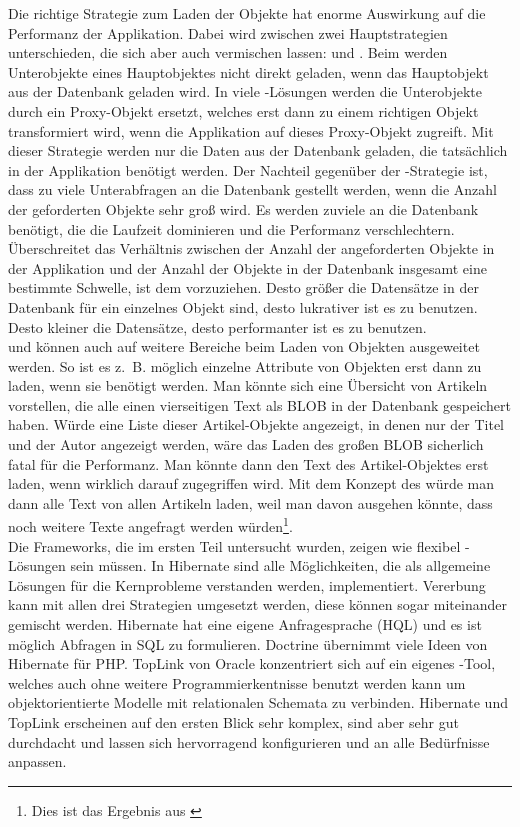 Die richtige Strategie zum Laden der Objekte hat enorme Auswirkung auf die Performanz der Applikation. Dabei wird zwischen zwei Hauptstrategien unterschieden, die sich aber auch vermischen lassen:  und . Beim  werden Unterobjekte eines Hauptobjektes nicht direkt geladen, wenn das Hauptobjekt aus der Datenbank geladen wird. In viele \ORM-Lösungen werden die Unterobjekte durch ein Proxy-Objekt ersetzt, welches erst dann zu einem richtigen Objekt transformiert wird, wenn die Applikation auf dieses Proxy-Objekt zugreift. Mit dieser Strategie werden nur die Daten aus der Datenbank geladen, die tatsächlich in der Applikation benötigt werden. Der Nachteil gegenüber der -Strategie ist, dass zu viele Unterabfragen an die Datenbank gestellt werden, wenn die Anzahl der geforderten Objekte sehr groß wird. Es werden zuviele  an die Datenbank benötigt, die die Laufzeit dominieren und die Performanz verschlechtern. Überschreitet das Verhältnis zwischen der Anzahl der angeforderten Objekte in der Applikation und der Anzahl der Objekte in der Datenbank insgesamt eine bestimmte Schwelle, ist  dem  vorzuziehen. Desto größer die Datensätze in der Datenbank für ein einzelnes Objekt sind, desto lukrativer ist es  zu benutzen. Desto kleiner die Datensätze, desto performanter ist es  zu benutzen. \\
 und  können auch auf weitere Bereiche beim Laden von Objekten ausgeweitet werden. So ist es z.~B. möglich einzelne Attribute von Objekten erst dann zu laden, wenn sie benötigt werden. Man könnte sich eine Übersicht von Artikeln vorstellen, die alle einen vierseitigen Text als BLOB in der Datenbank gespeichert haben. Würde eine Liste dieser Artikel-Objekte angezeigt, in denen nur der Titel und der Autor angezeigt werden, wäre das Laden des großen BLOB sicherlich fatal für die Performanz. Man könnte dann den Text des Artikel-Objektes erst laden, wenn wirklich darauf zugegriffen wird. Mit dem Konzept des  würde man dann alle Text von allen Artikeln laden, weil man davon ausgehen könnte, dass noch weitere Texte angefragt werden würden\footnote{Dies ist das Ergebnis aus \cite{Bernstein99context-basedprefetch}}. \\
Die Frameworks, die im ersten Teil untersucht wurden, zeigen wie flexibel \ORM-Lösungen sein müssen. In Hibernate sind alle Möglichkeiten, die als allgemeine Lösungen für die Kernprobleme verstanden werden, implementiert. Vererbung kann mit allen drei Strategien umgesetzt werden, diese können sogar miteinander gemischt werden. Hibernate hat eine eigene Anfragesprache (HQL) und es ist möglich Abfragen in SQL zu formulieren. Doctrine übernimmt viele Ideen von Hibernate für PHP. TopLink von Oracle konzentriert sich auf ein eigenes \ORM-Tool, welches auch ohne weitere Programmierkentnisse benutzt werden kann um objektorientierte Modelle mit relationalen Schemata zu verbinden. Hibernate und TopLink erscheinen auf den ersten Blick sehr komplex, sind aber sehr gut durchdacht und lassen sich hervorragend konfigurieren und an alle Bedürfnisse anpassen.\\
